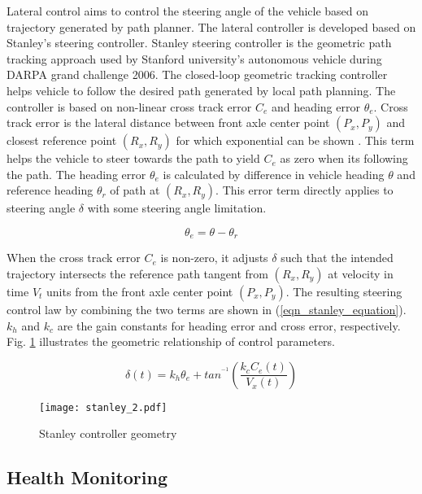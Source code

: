 \documentclass[10 pt,a4paper,conference]{IEEEtran}
\begin{document}
Lateral control aims to control the steering angle of the vehicle based
on trajectory generated by path planner. The lateral controller is
developed based on Stanley's \citep{ventures2006stanley} steering
controller. Stanley steering controller is the geometric path tracking
approach used by Stanford university's autonomous vehicle during DARPA
grand challenge 2006. The closed-loop geometric tracking controller
helps vehicle to follow the desired path generated by local path
planning. The controller is based on non-linear cross track error
$C_{e}$ and heading error $\theta_{e}$. Cross track error is the lateral
distance between front axle center point $(P_{x}, P_{y})$ and closest
reference point $(R_{x}, R_{y})$ for which exponential can be shown
\citep{ventures2006stanley}. This term helps the vehicle to steer
towards the path to yield $C_{e}$ as zero when its following the path.
The heading error $\theta_{e}$ is calculated by difference in vehicle
heading $\theta$ and reference heading $\theta_{r}$ of path at
$(R_{x}, R_{y})$. This error term directly applies to steering angle
$\delta$ with some steering angle limitation.

\begin{equation}
\label{eqn_heading_error}
\theta_{e} = \theta - \theta_{r}
\end{equation}

When the cross track error $C_{e}$ is non-zero, it adjusts $\delta$ such
that the intended trajectory intersects the reference path tangent from
$(R_{x}, R_{y})$ at velocity in time $V_{t}$ units from the front axle
center point $(P_{x}, P_{y})$. The resulting steering control law by
combining the two terms are shown in (\ref{eqn_stanley_equation}).
$k_{h}$ and $k_{c}$ are the gain constants for heading error and cross
error, respectively. Fig. \ref{fig_stanley} illustrates the geometric
relationship of control parameters.

\begin{equation}
\label{eqn_stanley_equation}
\delta(t) = k_{h}\theta_{e} + tan^{^{-1}}\left (\frac{k_{c}C_{e}(t)}{V_{x}(t)}  \right )
\end{equation}

\begin{figure}[!t]
\centering
\texttt{[image: stanley\_2.pdf]}
\caption{Stanley controller geometry}
\label{fig_stanley}
\end{figure}

\subsection{Health Monitoring}\label{health-monitoring}
\end{document}

